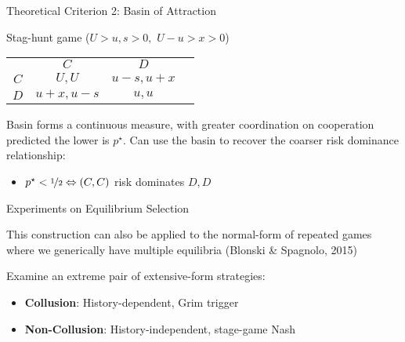 \documentclass[english]{beamer}
\begin{document}
\begin{frame}{Theoretical Criterion 2: Basin of Attraction}
\begin{card}
Stag-hunt game ($U>u,s>0,$ $U-u>x>0$)
    \begin{center}%
        \begin{tabular}{c|c|c|c}
            \multicolumn{1}{c}{} & \multicolumn{1}{c}{$C$} & \multicolumn{1}{c}{$D$} & \\ 
            \cline{2-3} \cline{3-3} 
            $C$ & $U,U$ & $u-s,u+x$ & \\ 
            \cline{2-3} \cline{3-3} 
            $D$ & $u+x,u-s$ & $u,u$ & \\ 
            \cline{2-3} \cline{3-3} 
        \end{tabular}
    \end{center}
\end{card}

\begin{card}
Basin forms a continuous measure, with greater coordination on cooperation predicted the lower is $p^{\star}$. Can use the basin to recover the coarser risk dominance relationship:
    \begin{itemize}
        \item $p^{\star}<\nicefrac{1}{2}\Leftrightarrow (C,C) $ risk dominates $D,D$
    \end{itemize}
\end{card}
\end{frame}

\begin{frame}{Experiments on Equilibrium Selection}
    \begin{card}
 This construction can also be applied to the normal-form of repeated games where we generically have multiple equilibria (Blonski \& Spagnolo, 2015)
 \end{card}
 
\begin{card} 
Examine an extreme pair of extensive-form strategies:
       \begin{itemize}
           \item \textbf{Collusion}: History-dependent, Grim trigger
           \item \textbf{Non-Collusion}: History-independent, stage-game Nash
       \end{itemize}
    \end{card}
\end{frame}
\end{document}
